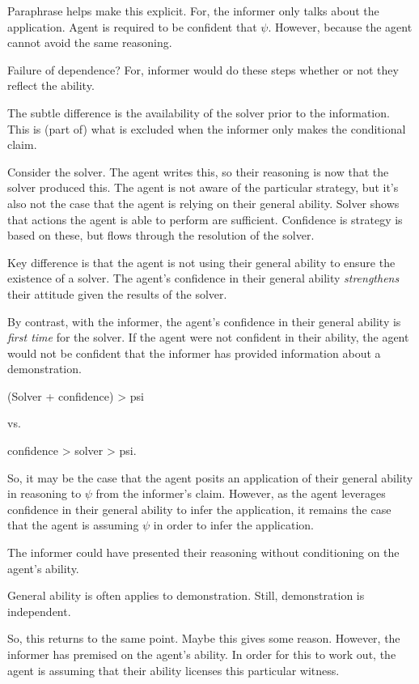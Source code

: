 \documentclass[10pt]{article}
\begin{document}
Paraphrase helps make this explicit.
For, the informer only talks about the application.
Agent is required to be confident that \(\psi\).
However, because the agent cannot avoid the same reasoning.

Failure of dependence?
For, informer would do these steps whether or not they reflect the ability.

The subtle difference is the availability of the solver prior to the information.
This is (part of) what is excluded when the informer only makes the conditional claim.

Consider the solver.
The agent writes this, so their reasoning is now that the solver produced this.
The agent is not aware of the particular strategy, but it's also not the case that the agent is relying on their general ability.
Solver shows that actions the agent is able to perform are sufficient.
Confidence is strategy is based on these, but flows through the resolution of the solver.

Key difference is that the agent is not using their general ability to ensure the existence of a solver.
The agent's confidence in their general ability \emph{strengthens} their attitude given the results of the solver.

By contrast, with the informer, the agent's confidence in their general ability is \emph{first time} for the solver.
If the agent were not confident in their ability, the agent would not be confident that the informer has provided information about a demonstration.

(Solver + confidence) > psi

vs.\

confidence  > solver > psi.

So, it may be the case that the agent posits an application of their general ability in reasoning to \(\psi\) from the informer's claim.
However, as the agent leverages confidence in their general ability to infer the application, it remains the case that the agent is assuming \(\psi\) in order to infer the application.

The informer could have presented their reasoning without conditioning on the agent's ability.

General ability is often applies to demonstration.
Still, demonstration is independent.

So, this returns to the same point.
Maybe this gives some reason.
However, the informer has premised on the agent's ability.
In order for this to work out, the agent is assuming that their ability licenses this particular witness.
\end{document}
